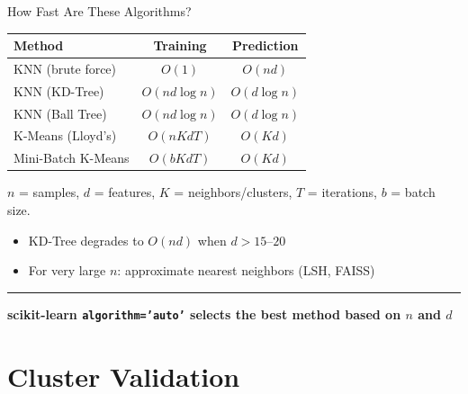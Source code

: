 \documentclass[8pt,aspectratio=169]{beamer}
\newcommand{\bottomnote}[1]{%
\vfill
\vspace{-2mm}
\textcolor{mllavender2}{\rule{\textwidth}{0.4pt}}
\vspace{1mm}
\footnotesize
\textbf{#1}
}
\begin{document}
\begin{frame}[t]{How Fast Are These Algorithms?}
\begin{center}
\begin{tabular}{lcc}
\toprule
\textbf{Method} & \textbf{Training} & \textbf{Prediction} \\
\midrule
KNN (brute force) & $O(1)$ & $O(nd)$ \\
KNN (KD-Tree) & $O(nd \log n)$ & $O(d \log n)$ \\
KNN (Ball Tree) & $O(nd \log n)$ & $O(d \log n)$ \\
K-Means (Lloyd's) & $O(nKdT)$ & $O(Kd)$ \\
Mini-Batch K-Means & $O(bKdT)$ & $O(Kd)$ \\
\bottomrule
\end{tabular}
\end{center}
\vspace{0.3em}
$n$ = samples, $d$ = features, $K$ = neighbors/clusters, $T$ = iterations, $b$ = batch size.
\begin{itemize}
\item KD-Tree degrades to $O(nd)$ when $d > 15$--$20$
\item For very large $n$: approximate nearest neighbors (LSH, FAISS)
\end{itemize}
\bottomnote{scikit-learn \texttt{algorithm='auto'} selects the best method based on $n$ and $d$}
\end{frame}

\section{Cluster Validation}
\end{document}

